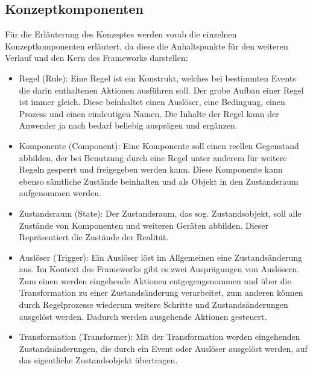     \subsection{Konzeptkomponenten}
    \label{subsec:conceptcomps}
        Für die Erläuterung des Konzeptes werden vorab die einzelnen Konzeptkomponenten erläutert, da diese die Anhaltspunkte 
        für den weiteren Verlauf und den Kern des Frameworks darstellen: %
        \begin{itemize} 
            \item Regel (Rule): Eine Regel ist ein Konstrukt, welches bei bestimmten Events die darin enthaltenen Aktionen ausführen soll. 
            Der grobe Aufbau einer Regel ist immer gleich. Diese beinhaltet einen Auslöser, eine Bedingung, einen Prozess und einen eindeutigen 
            Namen. Die Inhalte der Regel kann der Anwender ja nach bedarf beliebig ausprägen und ergänzen. 
            \item Komponente (Component): Eine Komponente soll einen reellen Gegenstand abbilden, der bei Benutzung durch eine Regel unter anderem 
            für weitere Regeln gesperrt und freigegeben werden kann. Diese Komponente kann ebenso sämtliche Zustände beinhalten und als Objekt in den Zustandsraum aufgenommen werden.
            \item Zustandsraum (State): Der Zustandsraum, das sog. Zustandsobjekt, soll alle Zustände von Komponenten und weiteren Geräten abbilden. Dieser Repräsentiert die Zustände der Realität.
            \item Auslöser (Trigger): Ein Auslöser löst im Allgemeinen eine Zustandsänderung aus. Im Kontext des Frameworks gibt es zwei Ausprägungen von 
            Auslösern. Zum einen werden eingehende Aktionen entgegengenommen und über die Transformation zu einer Zustandsänderung verarbeitet, zum anderen können durch Regelprozesse 
            wiederum weitere Schritte und Zustandsänderungen ausgelöst werden. Dadurch werden ausgehende Aktionen gesteuert. 
            \item Transformation (Transformer): Mit der Transformation werden eingehenden Zustandsänderungen, die durch ein Event oder Auslöser ausgelöst werden, 
            auf das eigentliche Zustandsobjekt übertragen. 
        \end{itemize}
